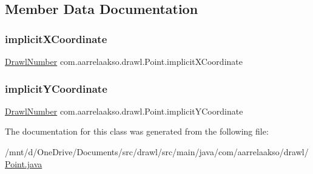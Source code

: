\subsection{Member Data Documentation}
\mbox{\label{classcom_1_1aarrelaakso_1_1drawl_1_1_point_ac6643d28a97dd4db5803239cf6652eda}} 
\subsubsection{\texorpdfstring{implicit\+X\+Coordinate}{implicitXCoordinate}}
{\footnotesize\ttfamily \hyperlink{classcom_1_1aarrelaakso_1_1drawl_1_1_drawl_number}{Drawl\+Number} com.\+aarrelaakso.\+drawl.\+Point.\+implicit\+X\+Coordinate\hspace{0.3cm}{\ttfamily [private]}}

\mbox{\label{classcom_1_1aarrelaakso_1_1drawl_1_1_point_a524e26eff45b9030d754788ed86f7ac2}} 
\subsubsection{\texorpdfstring{implicit\+Y\+Coordinate}{implicitYCoordinate}}
{\footnotesize\ttfamily \hyperlink{classcom_1_1aarrelaakso_1_1drawl_1_1_drawl_number}{Drawl\+Number} com.\+aarrelaakso.\+drawl.\+Point.\+implicit\+Y\+Coordinate\hspace{0.3cm}{\ttfamily [private]}}



The documentation for this class was generated from the following file\+:\begin{DoxyCompactItemize}
\item 
/mnt/d/\+One\+Drive/\+Documents/src/drawl/src/main/java/com/aarrelaakso/drawl/\hyperlink{_point_8java}{Point.\+java}\end{DoxyCompactItemize}
